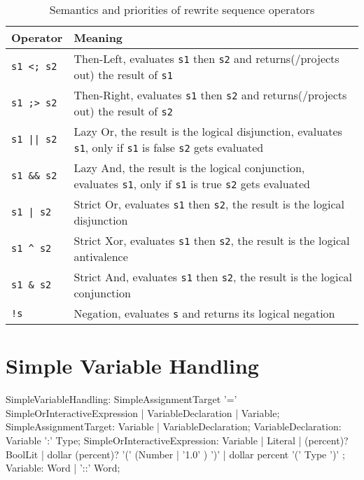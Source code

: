 \begin{table}[htbp]
    \begin{tabularx}{\linewidth}{l|X}
        \bf Operator & \bf Meaning \\\hline\hline
        \verb/s1 <; s2/ & Then-Left, evaluates \texttt{s1} then \texttt{s2} and returns(/projects out) the result of \texttt{s1}\\
		\verb/s1 ;> s2/ & Then-Right, evaluates \texttt{s1} then \texttt{s2} and returns(/projects out) the result of \texttt{s2}\\\hline
        \verb/s1 || s2/ & Lazy Or, the result is the logical disjunction, evaluates \texttt{s1}, only if \texttt{s1} is false \texttt{s2} gets evaluated\\\hline
        \verb/s1 && s2/ & Lazy And, the result is the logical conjunction, evaluates \texttt{s1}, only if \texttt{s1} is true \texttt{s2} gets evaluated\\\hline
        \verb/s1 | s2/ & Strict Or, evaluates \texttt{s1} then \texttt{s2}, the result is the logical disjunction\\\hline
        \verb/s1 ^ s2/ & Strict Xor, evaluates \texttt{s1} then \texttt{s2}, the result is the logical antivalence\\\hline
        \verb/s1 & s2/ & Strict And, evaluates \texttt{s1} then \texttt{s2}, the result is the logical conjunction\\\hline
        \verb/!s/ & Negation, evaluates \texttt{s} and returns its logical negation\\\hline
	\end{tabularx}    
    \caption{Semantics and priorities of rewrite sequence operators}
    \label{tbl:sequ:op}
\end{table}


\section{Simple Variable Handling}\label{sec:simplevarhandling}

\begin{rail}
  SimpleVariableHandling: SimpleAssignmentTarget '=' SimpleOrInteractiveExpression | VariableDeclaration | Variable;
  SimpleAssignmentTarget: Variable | VariableDeclaration; 
	VariableDeclaration: Variable ':' Type;
	SimpleOrInteractiveExpression:
		Variable |  
		Literal | 
    (percent)? BoolLit |
		dollar (percent)? '(' (Number | '1.0' ) ')' |
		dollar percent '(' Type ')'
  ;
  Variable: Word | '::' Word;
\end{rail}\makeatother


